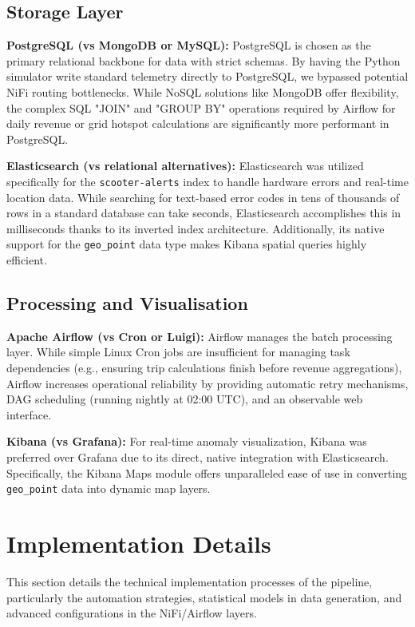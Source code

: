\documentclass[conference]{IEEEtran}
\begin{document}
\subsection{Storage Layer}
\textbf{PostgreSQL (vs MongoDB or MySQL):} PostgreSQL is chosen as the primary relational backbone for data with strict schemas. By having the Python simulator write standard telemetry directly to PostgreSQL, we bypassed potential NiFi routing bottlenecks. While NoSQL solutions like MongoDB offer flexibility, the complex SQL "JOIN" and "GROUP BY" operations required by Airflow for daily revenue or grid hotspot calculations are significantly more performant in PostgreSQL.

\textbf{Elasticsearch (vs relational alternatives):} Elasticsearch was utilized specifically for the \texttt{scooter-alerts} index to handle hardware errors and real-time location data. While searching for text-based error codes in tens of thousands of rows in a standard database can take seconds, Elasticsearch accomplishes this in milliseconds thanks to its inverted index architecture. Additionally, its native support for the \texttt{geo\_point} data type makes Kibana spatial queries highly efficient.

\subsection{Processing and Visualisation}
\textbf{Apache Airflow (vs Cron or Luigi):} Airflow manages the batch processing layer. While simple Linux Cron jobs are insufficient for managing task dependencies (e.g., ensuring trip calculations finish before revenue aggregations), Airflow increases operational reliability by providing automatic retry mechanisms, DAG scheduling (running nightly at 02:00 UTC), and an observable web interface.

\textbf{Kibana (vs Grafana):} For real-time anomaly visualization, Kibana was preferred over Grafana due to its direct, native integration with Elasticsearch. Specifically, the Kibana Maps module offers unparalleled ease of use in converting \texttt{geo\_point} data into dynamic map layers.


\section{Implementation Details}

This section details the technical implementation processes of the pipeline, particularly the automation strategies, statistical models in data generation, and advanced configurations in the NiFi/Airflow layers.
\end{document}
